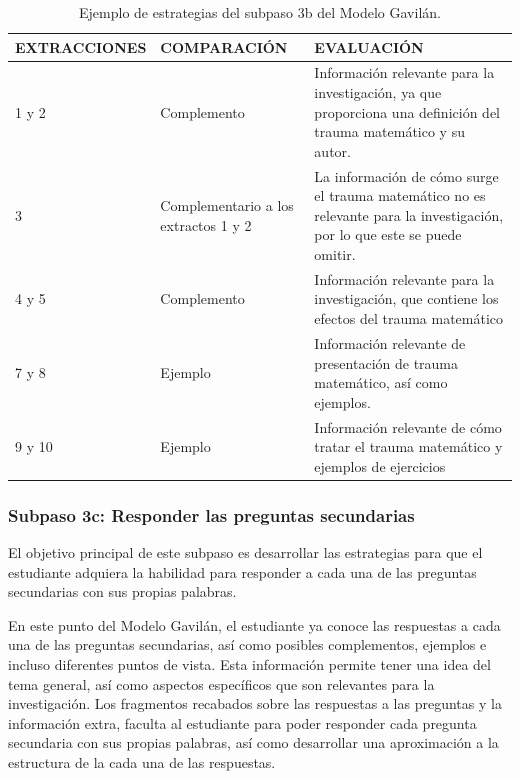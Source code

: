 \begin{table}[H]
  \begin{center}
    \begin{tabular}{ | p{4cm} | p{5cm} | p{7cm} | }
      \hline
      EXTRACCIONES & COMPARACIÓN & EVALUACIÓN \\ \hline
      1 y 2 & Complemento & Información relevante para la investigación, ya que proporciona una definición del trauma matemático y su autor. \\ \hline
      3 & Complementario a los extractos 1 y 2 & La información de cómo surge el trauma matemático no es relevante para la investigación, por lo que este se puede omitir. \\ \hline
      4 y 5 & Complemento & Información relevante para la investigación, que contiene los efectos del trauma matemático \\ \hline
      7 y 8 & Ejemplo & Información relevante de presentación de trauma matemático, así como ejemplos. \\ \hline
      9 y 10 & Ejemplo & Información relevante de cómo tratar el trauma matemático y ejemplos de ejercicios \\ \hline
    \end{tabular}
    \caption{Ejemplo de estrategias del subpaso 3b del Modelo Gavilán.}
    \label{tab:t6}
  \end{center}
\end{table}


\subsubsection{Subpaso 3c: Responder las preguntas secundarias}
\label{secPaso3cCap2}

El objetivo principal de este subpaso es desarrollar las estrategias para que el estudiante adquiera la habilidad para responder a cada una de las preguntas secundarias con sus propias palabras.

En este punto del Modelo Gavilán, el estudiante ya conoce las respuestas a cada una de las preguntas secundarias, así como posibles complementos, ejemplos e incluso diferentes puntos de vista. Esta información permite tener una idea del tema general, así como aspectos específicos que son relevantes para la investigación. Los fragmentos recabados sobre las respuestas a las preguntas y la información extra, faculta al estudiante para poder responder cada pregunta secundaria con sus propias palabras, así como desarrollar una aproximación a la estructura de la cada una de las respuestas.

